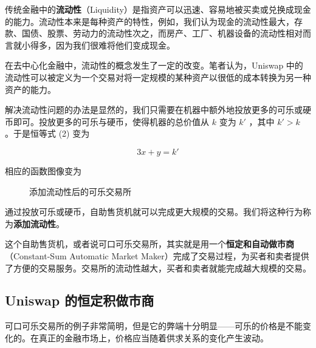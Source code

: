 \documentclass[12pt, a4paper, oneside]{ctexart}
\begin{document}
传统金融中的\textbf{流动性}（Liquidity）是指资产可以迅速、容易地被买卖或兑换成现金的能力。流动性本来是每种资产的特性，例如，我们认为现金的流动性最大，存款、国债、股票、劳动力的流动性次之，而房产、工厂、机器设备的流动性相对而言就小得多，因为我们很难将他们变成现金。

在去中心化金融中，流动性的概念发生了一定的改变。笔者认为，Uniswap 中的流动性可以被定义为一个交易对将一定规模的某种资产以很低的成本转换为另一种资产的能力。

解决流动性问题的办法是显然的，我们只需要在机器中额外地投放更多的可乐或硬币即可。投放更多的可乐与硬币，使得机器的总价值从 $k$ 变为 $k'$ ，其中 $k' > k$ 。于是恒等式 (2) 变为

\begin{equation}
    3x + y = k'
\end{equation}

相应的函数图像变为

\begin{figure}[htbp]
    \centering
    \caption{添加流动性后的可乐交易所}
\end{figure}

通过投放可乐或硬币，自助售货机就可以完成更大规模的交易。我们将这种行为称为\textbf{添加流动性}。

这个自助售货机，或者说可口可乐交易所，其实就是用一个\textbf{恒定和自动做市商}（Constant-Sum Automatic Market Maker）完成了交易过程，为买者和卖者提供了方便的交易服务。交易所的流动性越大，买者和卖者就能完成越大规模的交易。

\subsection{Uniswap 的恒定积做市商}

可口可乐交易所的例子非常简明，但是它的弊端十分明显——可乐的价格是不能变化的。在真正的金融市场上，价格应当随着供求关系的变化产生波动。
\end{document}
